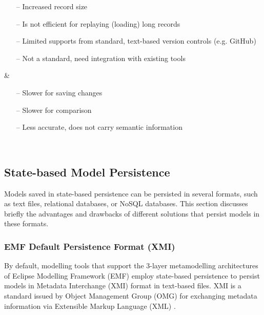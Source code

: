 \begin{table*}[h]
\begin{scriptsize}
\begin{tabular}
\begin{minipage}[t]{5cm}
\begin{itemize}[leftmargin=9pt]
          \setlength\itemsep{2pt}
          \item[--] Increased record size \cite{DBLP:journals/entcs/RobbesL07,DBLP:conf/edoc/KoegelHLHD10}
          \item[--] Is not efficient for replaying (loading) long records \cite{mens2002state}
          \item[--] Limited supports from standard, text-based version controls (e.g. GitHub) \cite{koegel2010emfstore} 
          \item[--] Not a standard, need integration with existing tools \cite{koegel2010emfstore} 
        \end{itemize}
      \end{minipage}
      & 
      \begin{minipage}[t]{5cm}
        \raggedright
        \begin{itemize}[leftmargin=9pt]
          \setlength\itemsep{2pt}
          \item[--] Slower for saving changes  \cite{mens2002state,daniel2016neoemf,DBLP:conf/models/Espinazo-PaganCM11}
          \item[--] Slower for comparison \cite{DBLP:conf/edoc/KoegelHLHD10}
          \item[--] Less accurate, does not carry semantic information \cite{mens2002state,DBLP:conf/edoc/KoegelHLHD10}  
        \end{itemize}
      \end{minipage}
      \\
      \hline
    \end{tabular} 
  \end{scriptsize}
\end{table*}

\subsection{State-based Model Persistence}
\label{sec:state_based_model_persistence}
Models saved in state-based persistence can be persisted in several formats, such as text files, relational databases, or NoSQL databases. This section discusses briefly the advantages and drawbacks of different solutions that persist models in these formats.

\subsubsection{EMF Default Persistence Format (XMI)}
\label{sec:xmi}
By default, modelling tools that support the 3-layer metamodelling architectures of Eclipse Modelling Framework (EMF) \cite{steinberg2008emf} employ state-based persistence to persist models in Metadata Interchange (XMI) format in text-based files. XMI is a standard issued by Object Management Group (OMG) for exchanging metadata information via Extensible Markup Language (XML) \cite{omg2018xmi}. 

